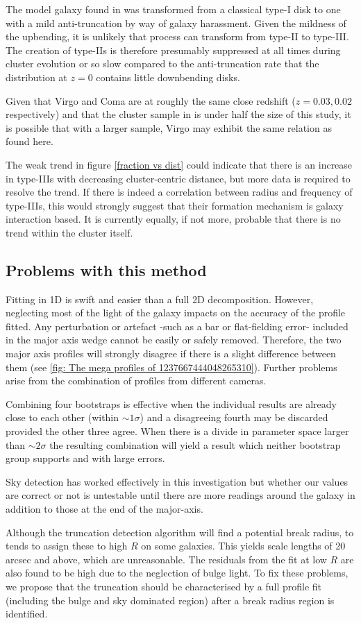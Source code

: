 The model galaxy found in \citet{moore_survival_1999,moore_galaxy_1996} was transformed from a classical type-I disk to one with a mild anti-truncation by way of galaxy harassment. Given the mildness of the upbending, it is unlikely that process can transform from type-II to type-III. The creation of type-IIs is therefore presumably suppressed at all times during cluster evolution or so slow compared to the anti-truncation rate that the distribution at $z=0$ contains little downbending disks.

Given that Virgo and Coma are at roughly the same close redshift ($z=0.03, 0.02$ respectively) \citep{bower_precision_1992} and that the cluster sample in \citet{erwin_strong_2012} is under half the size of this study, it is possible that with a larger sample, Virgo may exhibit the same relation as found here.

The weak trend in figure \ref{fraction vs dist} could indicate that there is an increase in type-IIIs with decreasing cluster-centric distance, but more data is required to resolve the trend. If there is indeed a correlation between radius and frequency of type-IIIs, this would strongly suggest that their formation mechanism is galaxy interaction based. It is currently equally, if not more, probable that there is no trend within the cluster itself. 

\subsection{Problems with this method}
Fitting in 1D is swift and easier than a full 2D decomposition. However, neglecting most of the light of the galaxy impacts on the accuracy of the profile fitted. Any perturbation or artefact -such as a bar or flat-fielding error- included in the major axis wedge cannot be easily or safely removed. Therefore, the two major axis profiles will strongly disagree if there is a slight difference between them (see \ref{fig: The mega profiles of 1237667444048265310}). Further problems arise from the combination of profiles from different cameras. 

Combining four bootstraps is effective when the individual results are already close to each other (within $\sim 1\sigma$) and a disagreeing fourth may be discarded provided the other three agree. When there is a divide in parameter space larger than $\sim 2\sigma$ the resulting combination will yield a result which neither bootstrap group supports and with large errors. 

Sky detection has worked effectively in this investigation but whether our values are correct or not is untestable until there are more readings around the galaxy in addition to those at the end of the major-axis. 

Although the truncation detection algorithm will find a potential break radius, to tends to assign these to high $R$ on some galaxies. This yields scale lengths of 20 arcsec and above, which are unreasonable. The residuals from the fit at low $R$ are also found to be high due to the neglection of bulge light. To fix these problems, we propose that the truncation should be characterised by a full profile fit (including the bulge and sky dominated region) after a break radius region is identified. 